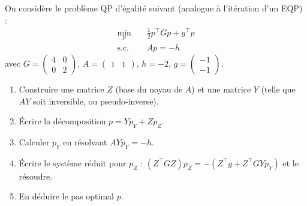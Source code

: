 \bigskip
\begin{exercice}
On considère le problème QP d'égalité suivant (analogue à l'itération d'un EQP) :
\begin{align*}
    \min_{p} \quad & \frac{1}{2} p^\top G p + g^\top p \\
    \text{s.c. } \quad & A p = -h
\end{align*}
avec $G = \begin{pmatrix} 4 & 0 \\ 0 & 2 \end{pmatrix}$, $A = \begin{pmatrix} 1 & 1 \end{pmatrix}$, $h = -2$, $g = \begin{pmatrix} -1 \\ -1 \end{pmatrix}$.
\begin{enumerate}
    \item Construire une matrice $Z$ (base du noyau de $A$) et une matrice $Y$ (telle que $AY$ soit inversible, ou pseudo-inverse).
    \item Écrire la décomposition $p = Y p_Y + Z p_Z$.
    \item Calculer $p_Y$ en résolvant $AY p_Y = -h$.
    \item Écrire le système réduit pour $p_Z$ : $(Z^\top G Z) p_Z = -(Z^\top g + Z^\top G Y p_Y)$ et le résoudre.
    \item En déduire le pas optimal $p$.
\end{enumerate}
\end{exercice}


